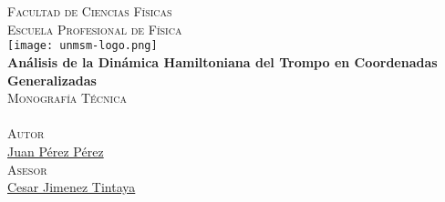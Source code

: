 \documentclass[11pt, oneside]{Thesis} %
\begin{document}
\begin{titlepage}
	\begin{center}
		
		\textsc{\Large \univname}\\[0.5cm] %
		\Large {}\\[0.4cm] %
		\textsc{\Large Facultad de Ciencias Físicas}\\[0.4cm] 
		\textsc{\Large Escuela Profesional de Física}\\[0.8cm] %
		
		\texttt{[image: unmsm-logo.png]}\\[0.7cm] %
		{\LARGE \bfseries Análisis de la Dinámica Hamiltoniana del Trompo en Coordenadas Generalizadas }\\[0.6cm] %
		\textsc{\Large Monografía Técnica}\\[0.3cm] 
		\large {}\\[0.6cm] %
		
		\textsc{\Large Autor}\\[0.3cm] 
		\href{http://www.tesista.biz}{Juan Pérez Pérez}\\[0.6cm] %
		
		\textsc{\Large Asesor}\\[0.3cm] 
		\href{https://ctivitae.concytec.gob.pe/appDirectorioCTI/VerDatosInvestigador.do?id_investigador=0017677}{Cesar Jimenez Tintaya}\\[2.2cm] %
		
		\large {}\\[0.3cm]
		\Large {}\\[0.3cm]
		
		\vfill
	\end{center}
	
\end{titlepage}


\end{document}
